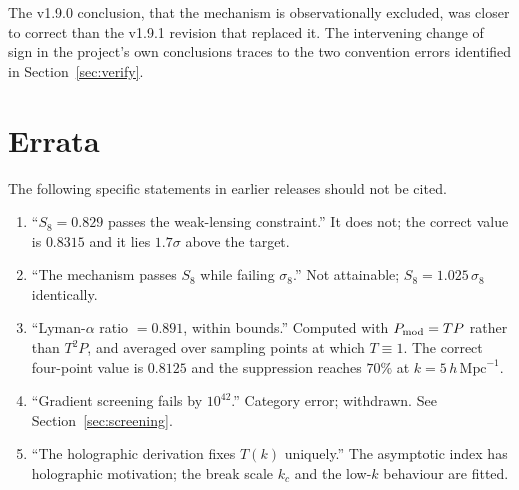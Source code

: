 \documentclass[11pt,a4paper]{article}
\newcommand{\hMpc}{h\,\mathrm{Mpc}^{-1}}
\begin{document}
\noindent
The v1.9.0 conclusion, that the mechanism is observationally excluded, was closer to
correct than the v1.9.1 revision that replaced it. The intervening change of sign in
the project's own conclusions traces to the two convention errors identified in
Section~\ref{sec:verify}.

\section{Errata}\label{app:errata}

The following specific statements in earlier releases should not be cited.

\begin{enumerate}[leftmargin=1.6em,itemsep=3pt]
\item ``$S_8=0.829$ passes the weak-lensing constraint.'' It does not; the correct
value is $0.8315$ and it lies $1.7\sigma$ above the target.
\item ``The mechanism passes $S_8$ while failing $\sigma_8$.'' Not attainable;
$S_8=1.025\,\sigma_8$ identically.
\item ``Lyman-$\alpha$ ratio $=0.891$, within bounds.'' Computed with
$P_{\rm mod}=TP$ rather than $T^2P$, and averaged over sampling points at which
$T\equiv1$. The correct four-point value is $0.8125$ and the suppression reaches
$70\%$ at $k=5\,\hMpc$.
\item ``Gradient screening fails by $10^{42}$.'' Category error; withdrawn. See
Section~\ref{sec:screening}.
\item ``The holographic derivation fixes $T(k)$ uniquely.'' The asymptotic index has
holographic motivation; the break scale $k_c$ and the low-$k$ behaviour are fitted.
\end{enumerate}
\end{document}
